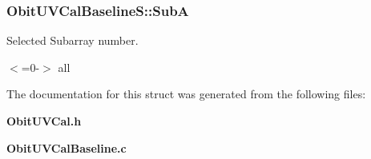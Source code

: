 \subsubsection{ {\bf Obit\-UVCal\-Baseline\-S::Sub\-A}}\label{structObitUVCalBaselineS_o7}


Selected Subarray number. 

$<$=0-$>$ all 

The documentation for this struct was generated from the following files:\begin{CompactItemize}
\item 
{\bf Obit\-UVCal.h}\item 
{\bf Obit\-UVCal\-Baseline.c}\end{CompactItemize}
